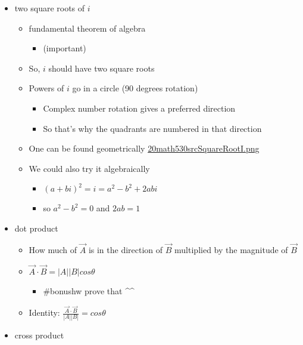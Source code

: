 \documentclass[letterpaper]{article}
\begin{document}
\begin{itemize}
\item two square roots of \(i\)

\begin{itemize}
\item fundamental theorem of algebra

\begin{itemize}
\item (important)
\end{itemize}

\item So, \(i\) should have two square roots
\item Powers of \(i\) go in a circle (90 degrees rotation)

\begin{itemize}
\item Complex number rotation gives a preferred direction
\item So that's why the quadrants are numbered in that direction
\end{itemize}

\item One can be found geometrically
\href{20math530srcSquareRootI.png.org}{20math530srcSquareRootI.png}
\item We could also try it algebraically

\begin{itemize}
\item \((a+bi)^2=i=a^2-b^2+2abi\)
\item so \(a^2-b^2 = 0\) and \(2ab = 1\)
\end{itemize}
\end{itemize}

\item dot product

\begin{itemize}
\item How much of \(\vec{A}\) is in the direction of \(\vec{B}\)
multiplied by the magnitude of \(\vec{B}\)
\item \(\vec{A} \cdot \vec{B} = |A||B| cos \theta\)

\begin{itemize}
\item \#bonushw prove that \^{}\^{}
\end{itemize}

\item Identity: \(\frac{\vec{A}\cdot\vec{B}}{|A||B|} = cos \theta\)
\end{itemize}

\item cross product


\end{itemize}
\end{document}
